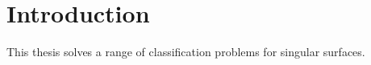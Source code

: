 \documentclass[12pt,a4paper]{book}      %
\theoremstyle{definition}
\begin{document}



\chapter{Introduction}

% 




%  
%  

This thesis solves a range of classification problems for singular surfaces.
\end{document}
